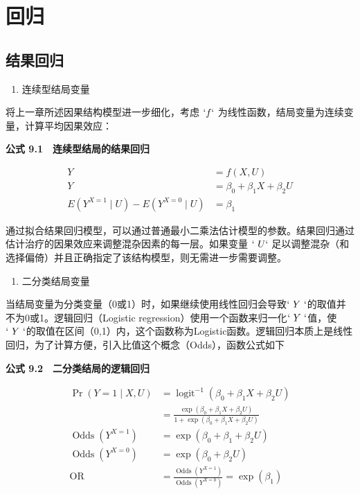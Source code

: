 \documentclass[
  chinese-hans,
  letterpaper,
  DIV=11,
  numbers=noendperiod]{scrreprt}
\providecommand{\tightlist}{%
  \setlength{\itemsep}{0pt}\setlength{\parskip}{0pt}}
\begin{document}

\chapter{回归}\label{ux56deux5f52}

\section{结果回归}\label{ux7ed3ux679cux56deux5f52}

\begin{enumerate}
\def\labelenumi{\arabic{enumi}.}
\tightlist
\item
  连续型结局变量
\end{enumerate}

将上一章所述因果结构模型进一步细化，考虑 \(`f`\)
为线性函数，结局变量为连续变量，计算平均因果效应：

\textbf{公式 9.1　连续型结局的结果回归}

\[\begin{aligned}
Y &= f(X, U) \\
Y &= \beta_0 + \beta_1 X + \beta_2 U \\
E\!\left(Y^{X=1}\mid U\right)-E\!\left(Y^{X=0}\mid U\right) &= \beta_1
\end{aligned}\]

通过拟合结果回归模型，可以通过普通最小二乘法估计模型的参数。结果回归通过估计治疗的因果效应来调整混杂因素的每一层。如果变量
\(`\ U`\)
足以调整混杂（和选择偏倚）并且正确指定了该结构模型，则无需进一步需要调整。

\begin{enumerate}
\def\labelenumi{\arabic{enumi}.}
\setcounter{enumi}{1}
\tightlist
\item
  二分类结局变量
\end{enumerate}

当结局变量为分类变量（0或1）时，如果继续使用线性回归会导致\(`\ Y\ `\)的取值并不为0或1。逻辑回归（Logistic
regression）使用一个函数来归一化\(`\ Y\ `\)值，使\(`\ Y\ `\)的取值在区间（0,1）内，这个函数称为Logistic函数。逻辑回归本质上是线性回归，为了计算方便，引入比值这个概念（Odds），函数公式如下

\textbf{公式 9.2　二分类结局的逻辑回归}

\[\begin{aligned}
\Pr(Y=1\mid X,U) &= \operatorname{logit}^{-1}(\beta_0+\beta_1X+\beta_2U) \\
&= \frac{\exp(\beta_0+\beta_1X+\beta_2U)}{1+\exp(\beta_0+\beta_1X+\beta_2U)} \\
\operatorname{Odds}(Y^{X=1}) &= \exp(\beta_0+\beta_1+\beta_2U) \\
\operatorname{Odds}(Y^{X=0}) &= \exp(\beta_0+\beta_2U) \\
\operatorname{OR} &= \frac{\operatorname{Odds}(Y^{X=1})}{\operatorname{Odds}(Y^{X=0})}=\exp(\beta_1)
\end{aligned}\]
\end{document}
